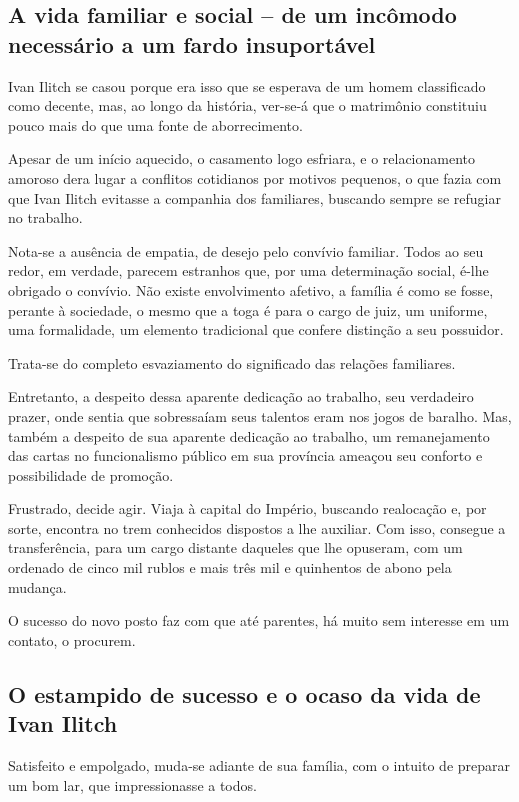 \documentclass[12pt]{extarticle}
\begin{document}
\subsection{A vida familiar e social -- de um incômodo necessário a um fardo
insuportável}

Ivan Ilitch se casou porque era isso que se esperava de um homem
classificado como decente, mas, ao longo da história, ver-se-á que o
matrimônio constituiu pouco mais do que uma fonte de aborrecimento.

Apesar de um início aquecido, o casamento logo esfriara, e o
relacionamento amoroso dera lugar a conflitos cotidianos por motivos
pequenos, o que fazia com que Ivan Ilitch evitasse a companhia dos
familiares, buscando sempre se refugiar no trabalho.

Nota-se a ausência de empatia, de desejo pelo convívio familiar. Todos
ao seu redor, em verdade, parecem estranhos que, por uma determinação
social, é-lhe obrigado o convívio. Não existe envolvimento afetivo, a
família é como se fosse, perante à sociedade, o mesmo que a toga é para
o cargo de juiz, um uniforme, uma formalidade, um elemento tradicional
que confere distinção a seu possuidor.

Trata-se do completo esvaziamento do significado das relações
familiares.

Entretanto, a despeito dessa aparente dedicação ao trabalho, seu
verdadeiro prazer, onde sentia que sobressaíam seus talentos eram nos
jogos de baralho. Mas, também a despeito de sua aparente dedicação ao
trabalho, um remanejamento das cartas no funcionalismo público em sua
província ameaçou seu conforto e possibilidade de promoção.

Frustrado, decide agir. Viaja à capital do Império, buscando realocação
e, por sorte, encontra no trem conhecidos dispostos a lhe auxiliar. Com
isso, consegue a transferência, para um cargo distante daqueles que lhe
opuseram, com um ordenado de cinco mil rublos e mais três mil e
quinhentos de abono pela mudança.

O sucesso do novo posto faz com que até parentes, há muito sem interesse
em um contato, o procurem.

\subsection{O estampido de sucesso e o ocaso da vida de Ivan Ilitch}

Satisfeito e empolgado, muda-se adiante de sua família, com o intuito de
preparar um bom lar, que impressionasse a todos.
\end{document}
